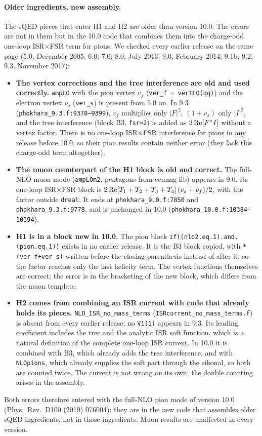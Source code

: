 \documentclass[11pt,a4paper]{article}
\newcommand{\code}[1]{\texttt{#1}}
\begin{document}
\paragraph{Older ingredients, new assembly.} The sQED pieces that enter H1 and H2 are older than
version 10.0. The errors are not in them but in the 10.0 code that combines them into the
charge-odd one-loop ISR$\times$FSR term for pions. We checked every earlier release on the same
page (5.0, December 2005; 6.0; 7.0; 8.0, July 2013; 9.0, February 2014; 9.1b; 9.2; 9.3,
November 2017):
\begin{itemize}
\item \textbf{The vertex corrections and the tree interference are old and used correctly.}
  \code{ampLO} with the pion vertex $v_f$ (\code{ver\_f = vertLO(qq)}) and the electron vertex
  $v_s$ (\code{ver\_s}) is present from 5.0 on. In 9.3 (\code{phokhara\_9.3.f:9378--9399}), $v_f$
  multiplies only $|F|^2$, $(1+v_s)$ only $|I|^2$, and the tree interference (block B3,
  \code{fsr=2}) is added as $2\,{\rm Re}[F^*I]$ without a vertex factor. There is no one-loop
  ISR$\times$FSR interference for pions in any release before 10.0, so their pion results
  contain neither error (they lack this charge-odd term altogether).
\item \textbf{The muon counterpart of the H1 block is old and correct.} The full-NLO muon mode
  (\code{ampLOm2}, pentagons from eemmg-lib) appears in 9.0. Its one-loop ISR$\times$FSR block
  is $2\,{\rm Re}[T_1+T_2+T_3+T_4]\,(v_s+v_f)/2$, with the factor outside \code{dreal}. It ends
  at \code{phokhara\_9.0.f:7850} and \code{phokhara\_9.3.f:9778}, and is unchanged in 10.0
  (\code{phokhara\_10.0.f:10384--10394}).
\item \textbf{H1 is in a block new in 10.0.} The pion block \code{if((nlo2.eq.1).and.(pion.eq.1))}
  exists in no earlier release. It is the B3 block copied, with \code{*(ver\_f+ver\_s)} written
  before the closing parenthesis instead of after it, so the factor reaches only the last
  helicity term. The vertex functions themselves are correct; the error is in the bracketing of
  the new block, which differs from the muon template.
\item \textbf{H2 comes from combining an ISR current with code that already holds its pieces.}
  \code{NLO\_ISR\_no\_mass\_terms} (\code{ISRcurrent\_no\_mass\_terms.f}) is absent from every
  earlier release; no \code{V1(1)} appears in 9.3. Its leading coefficient includes the tree
  and the analytic ISR soft function, which is a natural definition of the complete one-loop
  ISR current. In 10.0 it is combined with B3, which already adds the tree interference, and with
  \code{NLOpions}, which already supplies the soft part through the eikonal, so both are
  counted twice. The current is not wrong on its own; the double counting arises in the
  assembly.
\end{itemize}
Both errors therefore entered with the full-NLO pion mode of version 10.0 (Phys.\ Rev.\ D100
(2019) 076004): they are in the new code that assembles older sQED ingredients, not in those
ingredients. Muon results are unaffected in every version.
\end{document}
